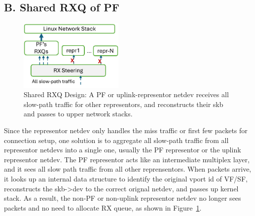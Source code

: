 \documentclass[letterpaper]{article}
\begin{document}
\subsection{B. Shared RXQ of PF}

\begin{figure}[t!]
\includegraphics[width=2in]{design1.pdf}
\centering
\caption{Shared RXQ Design: A PF or uplink-representor netdev receives all
slow-path traffic for other representors, and reconstructs their skb
and passes to upper network stacks.}
\label{fig:sharedrxq}
\end{figure}
Since the representor netdev only handles the miss traffic or first
few packets for connection setup, one solution is to aggregate all
slow-path traffic from all representor netdevs into a single one,
usually the PF representor or the uplink representor netdev.
The PF representor acts like an intermediate multiplex layer, and 
it sees all slow path traffic from all other reprensentors.
When packets arrive, it looks up an internal data structure to identify the
original vport id of VF/SF, reconstructs the skb->dev to the correct
orignal netdev, and passes up kernel stack. As a result, the
non-PF or non-uplink representor netdev no longer sees packets
and no need to allocate RX queue, as shown in Figure~\ref{fig:sharedrxq}.
\end{document}
